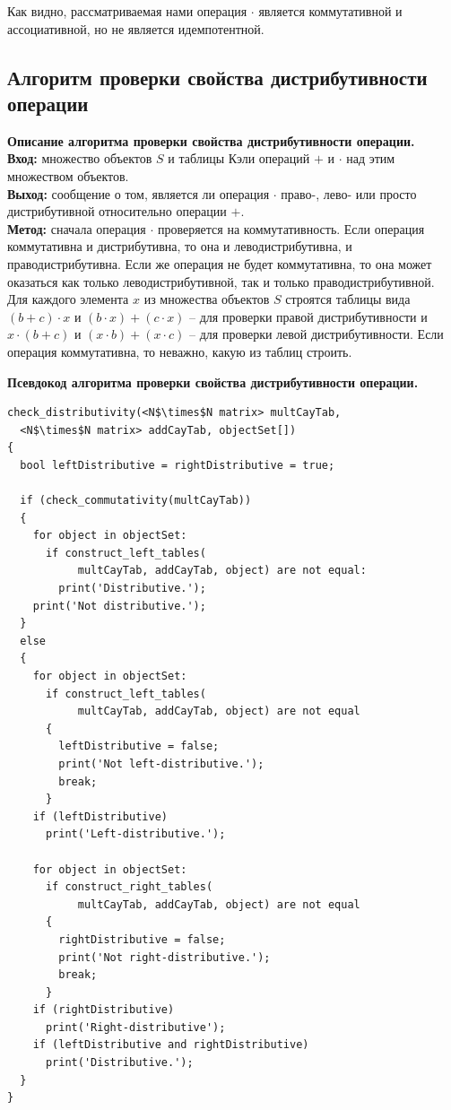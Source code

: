 \documentclass[spec, och, otchet, hidelinks]{SCWorks}
\newcommand{\tbf}[1]{\textbf{#1}}
\begin{document}
\par Как видно, рассматриваемая нами операция $\cdot$ является коммутативной и
ассоциативной, но не является идемпотентной.

\newpage

\subsection{Алгоритм проверки свойства дистрибутивности операции}
\par \tbf{Описание алгоритма проверки свойства дистрибутивности операции.} \\
\tbf{Вход:} множество объектов $S$ и таблицы Кэли операций $+$ и $\cdot$ над
этим множеством объектов. \\
\tbf{Выход:} сообщение о том, является ли операция $\cdot$ право-, лево- или
просто дистрибутивной относительно операции $+$. \\
\tbf{Метод:} сначала операция $\cdot$ проверяется на коммутативность. Если
операция коммутативна и дистрибутивна, то она и леводистрибутивна, и
праводистрибутивна. Если же операция не будет коммутативна, то она может
оказаться как только леводистрибутивной, так и только праводистрибутивной. Для
каждого элемента $x$ из множества объектов $S$ строятся таблицы вида $(b + c)
\cdot x$ и $(b \cdot x) + (c \cdot x)$ -- для проверки правой дистрибутивности и
$x \cdot (b + c)$ и $(x \cdot b) + (x \cdot c)$ -- для проверки левой
дистрибутивности. Если операция коммутативна, то неважно, какую из таблиц строить. \\

\par \tbf{Псевдокод алгоритма проверки свойства дистрибутивности операции.}
\begin{lstlisting}[caption=Псевдокод алгоритма., mathescape]
check_distributivity(<N$\times$N matrix> multCayTab, 
  <N$\times$N matrix> addCayTab, objectSet[])
{
  bool leftDistributive = rightDistributive = true;

  if (check_commutativity(multCayTab))
  {
    for object in objectSet:
      if construct_left_tables(
           multCayTab, addCayTab, object) are not equal:
        print('Distributive.');
    print('Not distributive.');
  }
  else 
  {
    for object in objectSet:
      if construct_left_tables(
           multCayTab, addCayTab, object) are not equal
      {
        leftDistributive = false;
        print('Not left-distributive.');
        break;
      }
    if (leftDistributive)
      print('Left-distributive.');
      
    for object in objectSet:
      if construct_right_tables(
           multCayTab, addCayTab, object) are not equal
      {
        rightDistributive = false;
        print('Not right-distributive.');
        break;
      }
    if (rightDistributive)
      print('Right-distributive');
    if (leftDistributive and rightDistributive)
      print('Distributive.');
  }
}
\end{lstlisting}
\end{document}
